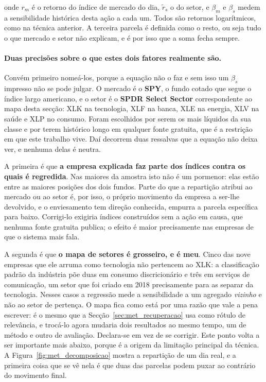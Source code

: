 onde $r_m$ é o retorno do índice de mercado do dia, $\tilde r_s$ o do setor, e $\beta_m$ e $\beta_s$
medem a sensibilidade histórica desta ação a cada um. Todos são retornos logarítmicos, como na
técnica anterior. A terceira parcela é definida como o resto, ou seja tudo o que mercado e setor
não explicam, e é por isso que a soma fecha sempre.

\paragraph{Duas precisões sobre o que estes dois fatores realmente são.}
Convém primeiro nomeá-los, porque a equação não o faz e sem isso um $\beta_s$ impresso não se pode
julgar. O mercado é o \textbf{SPY}, o fundo cotado que segue o índice largo americano, e o setor é
o \textbf{SPDR Select Sector} correspondente ao mapa desta secção: XLK na tecnologia, XLF na banca,
XLE na energia, XLV na saúde e XLP no consumo. Foram escolhidos por serem os mais líquidos da sua
classe e por terem histórico longo em qualquer fonte gratuita, que é a restrição em que este
trabalho vive. Daí decorrem duas ressalvas que a equação não deixa ver, e nenhuma delas é neutra.

A primeira é que \textbf{a empresa explicada faz parte dos índices contra os quais é regredida}.
Nas maiores da amostra isto não é um pormenor: elas estão entre as maiores posições dos dois
fundos. Parte do que a repartição atribui ao mercado ou ao setor é, por isso, o próprio movimento
da empresa a ser-lhe devolvido, e o enviesamento tem direção conhecida, empurra a parcela
específica para baixo. Corrigi-lo exigiria índices construídos sem a ação em causa, que nenhuma
fonte gratuita publica; o efeito é maior precisamente nas empresas de que o sistema mais fala.

A segunda é que \textbf{o mapa de setores é grosseiro, e é meu}. Cinco das nove empresas que ele
arruma como tecnologia não pertencem ao XLK: a classificação padrão da indústria põe duas em
consumo discricionário e três em serviços de comunicação, um setor que foi criado em 2018
precisamente para as separar da tecnologia. Nesses casos a regressão mede a
sensibilidade a um agregado \emph{vizinho} e não ao setor de pertença. O mapa fica como está por uma
razão que vale a pena escrever: é o mesmo que a Secção~\ref{sec:met_recuperacao} usa como rótulo de
relevância, e trocá-lo agora mudaria dois resultados ao mesmo tempo, um de método e outro de
avaliação. Declara-se em vez de se corrigir. Este ponto
volta a ser importante mais abaixo, porque é a origem da limitação principal da técnica. A
Figura~\ref{fig:met_decomposicao} mostra a repartição de um dia real, e a primeira coisa que
se vê nela é que duas das parcelas podem puxar ao contrário do movimento final.

